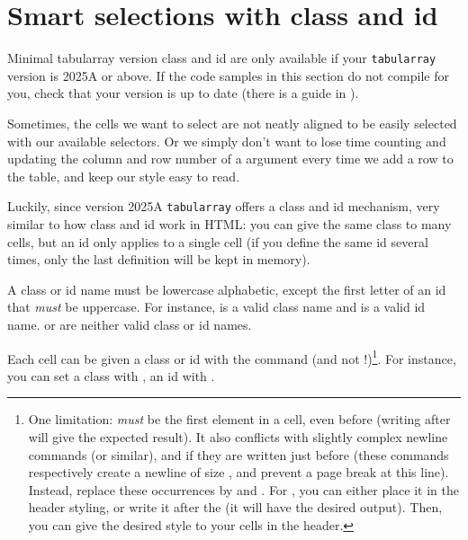 \section{Smart selections with class and id}

\begin{warningbox}{Minimal tabularray version}
	class and id are only available if your \texttt{tabularray} version is 2025A or above. If the code samples in this section do not compile for you, check that your version is up to date (there is a guide in ).
\end{warningbox}

Sometimes, the cells we want to select are not neatly aligned to be easily selected with our available selectors. Or we simply don't want to lose time counting and updating the column and row number of a  argument every time we add a row to the table, and keep our style easy to read.

Luckily, since version 2025A \texttt{tabularray} offers a class and id mechanism, very similar to how class and id work in HTML: you can give the same class to many cells, but an id only applies to a single cell (if you define the same id several times, only the last definition will be kept in memory).

A class or id name must be lowercase alphabetic, except the first letter of an id that \emph{must} be uppercase. For instance,  is a valid class name and  is a valid id name.  or  are neither valid class or id names.

Each cell can be given a class or id with the command  (and not !)\footnote{One limitation:  \emph{must} be the first element in a cell, even before  (writing  after   will give the expected result). It also conflicts with slightly complex newline commands  \snippet{\textbackslash\textbackslash[1em]} (or similar), and \snippet{\textbackslash\textbackslash*} if they are written just before (these commands respectively create a newline of size \snippet{1em}, and prevent a page break at this line). Instead, replace these occurrences by  and 
. For , you can either place it in the header styling, or write it after the  (it will have the desired output). Then, you can give the desired style to your cells in the header.
}. For instance, you can set a class with , an id with . 
	

